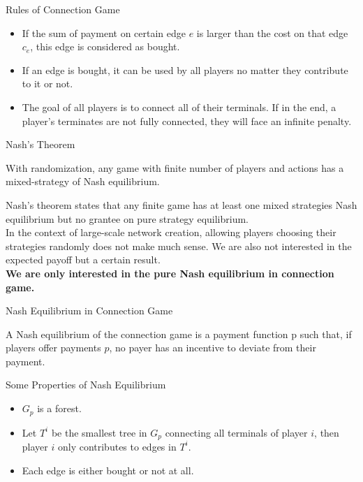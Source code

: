 \documentclass[11pt,aspectratio=169]{beamer}
\begin{document}
\begin{frame}{Rules of Connection Game}
\begin{definition}
    \begin{itemize}
    \item If the sum of payment on certain edge \(e\) is larger than the cost on that edge \(c_e\), this edge is considered as bought.
    \item If an edge is bought, it can be used by all players no matter they contribute to it or not. \\
    \item The goal of all players is to connect all of their terminals. If in the end, a player's terminates are not fully connected, they will face an infinite penalty.  
    \end{itemize}
    \end{definition}
\end{frame}

\begin{frame}{Nash's Theorem}
    \begin{theorem}
        With randomization, any game with finite number of players and actions has a mixed-strategy of Nash equilibrium.
    \end{theorem}
    Nash's theorem states that any finite game has at least one mixed strategies Nash equilibrium but no grantee on pure strategy equilibrium.\\ 
    \vspace{10pt}
    In the context of large-scale network creation, allowing players choosing their strategies randomly does not make much sense. We are also not interested in the expected payoff but a certain result.\\
    \vspace{10pt}
    \textbf{We are only interested in the pure Nash equilibrium in connection game.}
\end{frame}

\begin{frame}{Nash Equilibrium in Connection Game}
    \begin{definition}
       A Nash equilibrium of the connection game is a payment function p such that, if players offer payments \(p\), no payer has an incentive to deviate from their payment. 
   \end{definition}
\end{frame}

\begin{frame}{Some Properties of Nash Equilibrium}
    \begin{itemize}
        \item \(G_p\) is a forest.
        \item Let \(T^i\) be the smallest tree in \(G_p\) connecting all terminals of player \(i\), then player \(i\) only contributes to edges in \(T^i\).
        \item Each edge is either bought or not at all. 
    \end{itemize}
    
\end{frame}
\end{document}

